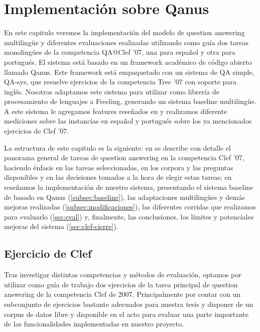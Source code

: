 \chapter{Implementación sobre Qanus}
\label{chap:qanus} \label{chap:5}

En este capitulo veremos la implementación del modelo de question answering multilingüe y diferentes evaluaciones realizadas utilizando como guía dos tareas monolingües de la competencia QA@Clef '07, una para español y otra para portugués. El sistema está basado en un framework académico de código abierto llamado Qanus. Este framework está empaquetado con un sistema de QA simple, QA-sys, que resuelve ejercicios de la competencia Trec '07 con soporte para inglés. Nosotros adaptamos este sistema para utilizar como librería de procesamiento de lenguajes a Freeling, generando un sistema baseline multilingüe. A este sistema le agregamos features reseñados en  y realizamos diferente mediciones sobre las instancias en español y portugués sobre los ya mencionados ejercicios de Clef '07.

La estructura de este capitulo es la siguiente: en  se describe con detalle el panorama general de tareas de question answering en la competencia Clef '07, haciendo énfasis en las tareas seleccionadas, en los corpora y las preguntas disponibles y en las decisiones tomadas a la hora de elegir estas tareas; en  reseñamos la implementación de nuestro sistema, presentando el sistema baseline de basado en Qanus (\ref{subsec:baseline}), las adaptaciones multilingües y demás mejoras realizadas (\ref{subsec:modificaciones}), las diferentes corridas que realizamos para evaluarlo (\ref{sec:eval}) y, finalmente, las conclusiones, los límites y potenciales mejoras del sistema (\ref{sec:clef-cierre}).

\section{Ejercicio de Clef}
\label{sec:ejercicio-de-clef}
Tras investigar distintas competencias y métodos de evaluación, optamos por utilizar como guía de trabajo dos ejercicios de la tarea principal de question answering de la competencia Clef de 2007. Principalmente por contar con un subconjunto de ejercicios bastante adecuados para nuestra tesis y disponer de un corpus de datos libre y disponible en el acto para evaluar una parte importante de las funcionalidades implementadas en nuestro proyecto.


